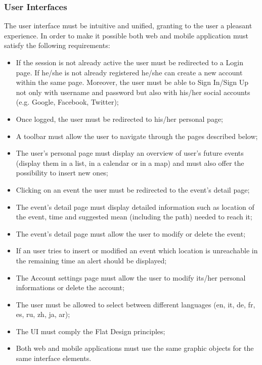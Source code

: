 \documentclass{article}
\begin{document}
	\subsubsection{User Interfaces}
	The user interface must be intuitive and unified, granting to the user a pleasant experience. In order to make it possible both web and mobile application must satisfy the following requirements:
	\begin{itemize}
		\item If the session is not already active the user must be redirected to a Login page. If he/she is not already registered he/she can create a new account within the same page. Moreover, the user must be able to Sign In/Sign Up not only with username and password but also with his/her social accounts (e.g. Google, Facebook, Twitter);
		\item Once logged, the user must be redirected to his/her personal page;
		\item A toolbar must allow the user to navigate through the pages described below;
		\item The user's personal page must display an overview of user's future events (display them in a list, in a calendar or in a map) and must also offer the possibility to insert new ones;
		\item Clicking on an event the user must be redirected to the event's detail page;
		\item The event's detail page must display detailed information such as location of the event, time and suggested mean (including the path)  needed to reach it;
		\item The event's detail page must allow the user to modify or delete the event;
		\item If an user tries to insert or modified an event which location is unreachable in the remaining time an alert should be displayed;
		\item The Account settings page must allow the user to modify its/her personal informations or delete the account;
		\item The user must be allowed to select between different languages (en, it, de, fr, es, ru, zh, ja, ar);
		\item The UI must comply the Flat Design principles;
		\item Both web and mobile applications must use the same graphic objects for the same interface elements.
	\end{itemize}
	
\end{document}
